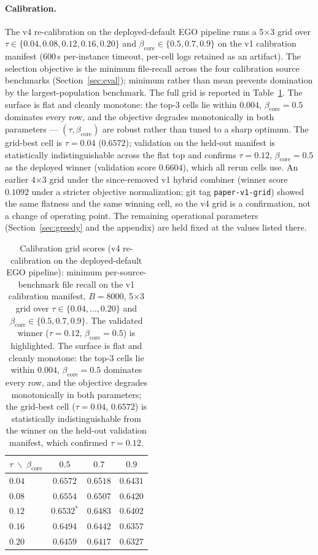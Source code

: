 \documentclass[11pt, a4paper]{article}
\begin{document}
\paragraph{Calibration.} The v4 re-calibration on the deployed-default EGO pipeline runs a 5$\times$3 grid over $\tau \in \{0.04, 0.08, 0.12, 0.16, 0.20\}$ and $\beta_{\mathrm{core}} \in \{0.5, 0.7, 0.9\}$ on the v1 calibration manifest (600\,s per-instance timeout, per-cell logs retained as an artifact). The selection objective is the minimum file-recall across the four calibration source benchmarks (Section~\ref{sec:eval}); minimum rather than mean prevents domination by the largest-population benchmark. The full grid is reported in Table~\ref{tab:calibration-grid}. The surface is flat and cleanly monotone: the top-3 cells lie within $0.004$, $\beta_{\mathrm{core}}{=}0.5$ dominates every row, and the objective degrades monotonically in both parameters --- $(\tau, \beta_{\mathrm{core}})$ are robust rather than tuned to a sharp optimum. The grid-best cell is $\tau{=}0.04$ ($0.6572$); validation on the held-out manifest is statistically indistinguishable across the flat top and confirms $\tau{=}0.12$, $\beta_{\mathrm{core}}{=}0.5$ as the deployed winner (validation score $0.6604$), which all rerun cells use. An earlier 4$\times$3 grid under the since-removed v1 hybrid combiner (winner score $0.1092$ under a stricter objective normalization; git tag \texttt{paper-v1-grid}) showed the same flatness and the same winning cell, so the v4 grid is a confirmation, not a change of operating point. The remaining operational parameters (Section~\ref{sec:greedy} and the appendix) are held fixed at the values listed there.

\begin{table}[h]
\centering
\caption{Calibration grid scores (v4 re-calibration on the deployed-default EGO pipeline): minimum per-source-benchmark file recall on the v1 calibration manifest, $B{=}8000$, 5$\times$3 grid over $\tau \in \{0.04, \dots, 0.20\}$ and $\beta_{\mathrm{core}} \in \{0.5, 0.7, 0.9\}$. The validated winner ($\tau{=}0.12$, $\beta_{\mathrm{core}}{=}0.5$) is highlighted. The surface is flat and cleanly monotone: the top-3 cells lie within $0.004$, $\beta_{\mathrm{core}}{=}0.5$ dominates every row, and the objective degrades monotonically in both parameters; the grid-best cell ($\tau{=}0.04$, $0.6572$) is statistically indistinguishable from the winner on the held-out validation manifest, which confirmed $\tau{=}0.12$.}
\label{tab:calibration-grid}
\begin{tabular}{lccc}
\toprule
$\tau \; \backslash \; \beta_{\mathrm{core}}$ & $0.5$ & $0.7$ & $0.9$ \\
\midrule
$0.04$ & $0.6572$ & $0.6518$ & $0.6431$ \\
$0.08$ & $0.6554$ & $0.6507$ & $0.6420$ \\
$0.12$ & $\mathbf{0.6532^\ast}$ & $0.6483$ & $0.6402$ \\
$0.16$ & $0.6494$ & $0.6442$ & $0.6357$ \\
$0.20$ & $0.6459$ & $0.6417$ & $0.6327$ \\
\bottomrule
\end{tabular}
\end{table}
\end{document}
